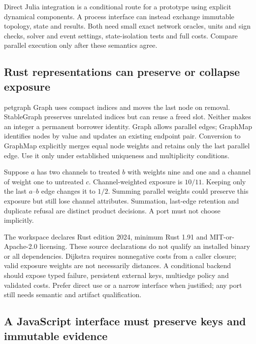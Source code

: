 Direct Julia integration is a conditional route for a prototype using explicit
dynamical components. A process interface can instead exchange immutable
topology, state and results. Both need small exact network oracles, units and
sign checks, solver and event settings, state-isolation tests and full costs.
Compare parallel execution only after these semantics agree.
\citep{exec25_onet_choice}

\subsection{Rust representations can preserve or collapse exposure}

petgraph Graph uses compact indices and moves the last node on removal.
StableGraph preserves unrelated indices but can reuse a freed slot. Neither
makes an integer a permanent borrower identity. Graph allows parallel edges;
GraphMap identifies nodes by value and updates an existing endpoint pair.
Conversion to GraphMap explicitly merges equal node weights and retains only
the last parallel edge. Use it only under established uniqueness and
multiplicity conditions.~\citep{exec25_onet_petgraph}

Suppose $a$ has two channels to treated $b$ with weights nine and one and a
channel of weight one to untreated $c$. Channel-weighted exposure is $10/11$.
Keeping only the last $a$--$b$ edge changes it to $1/2$. Summing parallel
weights could preserve this exposure but still lose channel attributes.
Summation, last-edge retention and duplicate refusal are distinct product
decisions. A port must not choose implicitly.
\citep{exec25_onet_petgraph,exec25_onet_choice}

The workspace declares Rust edition 2024, minimum Rust 1.91 and
MIT-or-Apache-2.0 licensing. These source declarations do not qualify an
installed binary or all dependencies. Dijkstra requires nonnegative costs
from a caller closure; valid exposure weights are not necessarily distances.
A conditional backend should expose typed failure, persistent external keys,
multiedge policy and validated costs. Prefer direct use or a narrow interface
when justified; any port still needs semantic and artifact qualification.
\citep{exec25_onet_petgraph,exec25_onet_choice}

\subsection{A JavaScript interface must preserve keys and immutable evidence}

